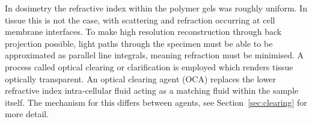 \documentclass[12pt]{article}
\begin{document}
	
	
In dosimetry the refractive index within the polymer gels was roughly uniform. In tissue this is not the case, with scattering and refraction occurring at cell membrane interfaces. To make high resolution reconstruction through back projection possible, light paths through the specimen must be able to  be approximated as parallel line integrals, meaning refraction must be minimised. A process called optical clearing or clarification is employed which renders tissue optically transparent. An optical clearing agent (OCA) replaces the lower refractive index intra-cellular fluid acting as a matching fluid within the sample itself. The mechanism for this differs between agents, see Section~\ref{sec:clearing} for more detail. 
\end{document}
